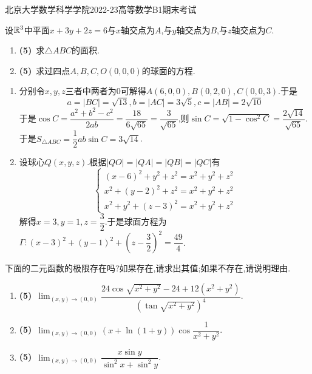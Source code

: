 \documentclass{ctexart}
\begin{document}
\pagestyle{empty}
\begin{center}\Large
北京大学数学科学学院2022-23高等数学B1期末考试
\end{center}
\begin{problem}[1.(10\songti{分})]
设$\mathbb{R}^3$中平面$x+3y+2z=6$与$x$轴交点为$A$,与$y$轴交点为$B$,与$z$轴交点为$C$.
        \begin{enumerate}[label=\textbf{(\arabic*)},leftmargin=*]
            \item \textbf{(5)}\ 求$\triangle ABC$的面积.
            \item \textbf{(5)}\ 求过四点$A,B,C,O(0,0,0)$的球面的方程.
        \end{enumerate}
\end{problem}
\begin{solution}
\begin{enumerate}[label=\textbf{(\arabic*)},leftmargin=*]
        \item 分别令$x,y,z$三者中两者为$0$可解得$A(6,0,0),B(0,2,0),C(0,0,3)$.于是
            $$a=|BC|=\sqrt{13},b=|AC|=3\sqrt{5},c=|AB|=2\sqrt{10}$$
            于是$\cos C=\dfrac{a^2+b^2-c^2}{2ab}=\dfrac{18}{6\sqrt{65}}=\dfrac{3}{\sqrt{65}}$,则$\sin C=\sqrt{1-\cos^2C}=\dfrac{2\sqrt{14}}{\sqrt{65}}$.\\
            于是$S_{\triangle ABC}=\dfrac{1}{2}ab\sin C=3\sqrt{14}$.
        \item 设球心$Q(x,y,z)$.根据$|QO|=|QA|=|QB|=|QC|$有
            $$\left\{\begin{array}{l}
                (x-6)^2+y^2+z^2=x^2+y^2+z^2\\
                x^2+(y-2)^2+z^2=x^2+y^2+z^2\\
                x^2+y^2+(z-3)^2=x^2+y^2+z^2
            \end{array}\right.$$
            解得$x=3,y=1,z=\dfrac{3}{2}$.于是球面方程为$\Gamma:(x-3)^2+(y-1)^2+\left(z-\dfrac{3}{2}\right)^2=\dfrac{49}{4}$.
    \end{enumerate}
\end{solution}
\begin{problem}[2.(15\songti{分})]
下面的二元函数的极限存在吗?如果存在,请求出其值;如果不存在,请说明理由.
        \begin{enumerate}[label=\textbf{(\arabic*)},leftmargin=*]
            \item \textbf{(5)}\ $\displaystyle\lim_{(x,y)\to(0,0)}\dfrac{24\cos\sqrt{x^2+y^2}-24+12\left(x^2+y^2\right)}{\left(\tan\sqrt{x^2+y^2}\right)^4}$.
            \item \textbf{(5)}\ $\displaystyle\lim_{(x,y)\to(0,0)}\left(x+\ln(1+y)\right)\cos\dfrac{1}{x^2+y^2}$.
            \item \textbf{(5)}\ $\displaystyle\lim_{(x,y)\to(0,0)}\dfrac{x\sin y}{\sin^2x+\sin^2y}$.
        \end{enumerate}
\end{problem}
\end{document}
